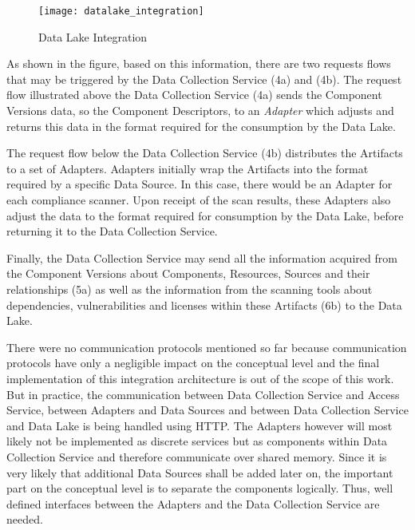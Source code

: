 \begin{figure}[H]
	\centering
	\texttt{[image: datalake\_integration]}
	\caption[Data Lake Integration]{Data Lake Integration }
	\label{fig:DataLakeIntegration}
\end{figure}
As shown in the figure, based on this information, there are two requests flows that may be triggered by the Data Collection Service (4a) and (4b). The request flow illustrated above the Data Collection Service (4a) sends the Component Versions data, so the Component Descriptors, to an \emph{Adapter} which adjusts and returns this data in the format required for the consumption by the Data Lake.\par 
The request flow below the Data Collection Service (4b) distributes the Artifacts to a set of Adapters. Adapters initially wrap the Artifacts into the format required by a specific Data Source. In this case, there would be an Adapter for each compliance scanner. Upon receipt of the scan results, these Adapters also adjust the data to the format required for consumption by the Data Lake, before returning it to the Data Collection Service.\par 
Finally, the Data Collection Service may send all the information acquired from the Component Versions about Components, Resources, Sources and their relationships (5a) as well as the information from the scanning tools about dependencies, vulnerabilities and licenses within these Artifacts (6b) to the Data Lake.\par
There were no communication protocols mentioned so far because communication protocols have only a negligible impact on the conceptual level and the final implementation of this integration architecture is out of the scope of this work. But in practice, the communication between Data Collection Service and Access Service, between Adapters and Data Sources and between Data Collection Service and Data Lake is being handled using HTTP. The Adapters however will most likely not be implemented as discrete services but as components within Data Collection Service and therefore communicate over shared memory. Since it is very likely that additional Data Sources shall be added later on, the important part on the conceptual level is to separate the components logically. Thus, well defined interfaces between the Adapters and the Data Collection Service are needed.



